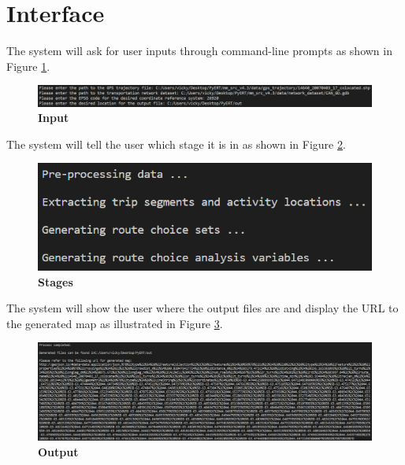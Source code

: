 \documentclass[12pt, titlepage]{article}
\begin{document}
% 


% 


\newpage{}

\appendix

\section{Interface}
\label{UI}
The system will ask for user inputs through command-line prompts as shown in Figure \ref{fig:input}.
\begin{figure}[H]
    \centering
    \includegraphics[scale=0.55]{input.png}
    \caption{\bf Input}
    \label{fig:input}
\end{figure}

The system will tell the user which stage it is in as shown in Figure \ref{fig:stages}.
\begin{figure}[H]
    \centering
    \includegraphics[scale=0.55]{stages.png}
    \caption{\bf Stages}
    \label{fig:stages}
\end{figure}

The system will show the user where the output files are and display the URL to the generated map as illustrated in Figure \ref{fig:output}.
\begin{figure}[H]
    \centering
    \includegraphics[scale=0.4]{output.png}
    \caption{\bf Output}
    \label{fig:output}
\end{figure}
\end{document}
